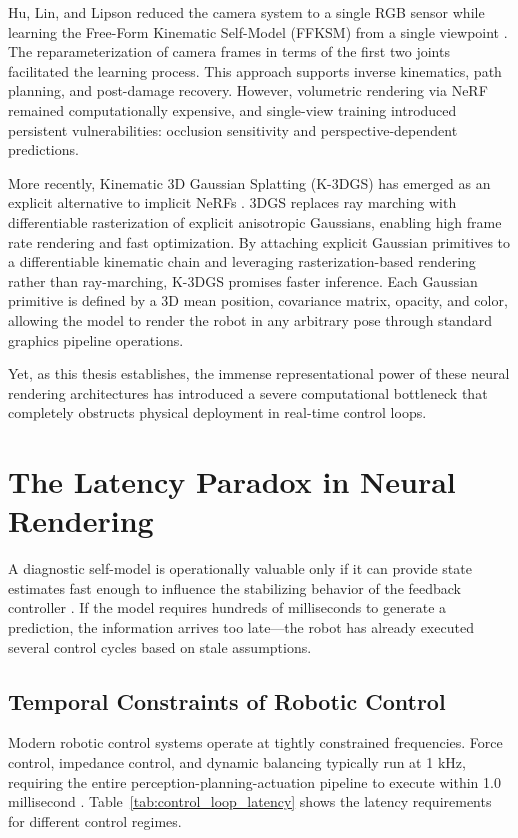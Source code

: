 \documentclass[12pt,a4paper,oneside]{report}
\begin{document}
Hu, Lin, and Lipson reduced the camera system to a single RGB sensor while learning the Free-Form Kinematic Self-Model (FFKSM) from a single viewpoint \cite{hu2024teaching}. The reparameterization of camera frames in terms of the first two joints facilitated the learning process. This approach supports inverse kinematics, path planning, and post-damage recovery. However, volumetric rendering via NeRF remained computationally expensive, and single-view training introduced persistent vulnerabilities: occlusion sensitivity and perspective-dependent predictions.

More recently, Kinematic 3D Gaussian Splatting (K-3DGS) has emerged as an explicit alternative to implicit NeRFs \cite{hu2025learning}. 3DGS replaces ray marching with differentiable rasterization of explicit anisotropic Gaussians, enabling high frame rate rendering and fast optimization. By attaching explicit Gaussian primitives to a differentiable kinematic chain and leveraging rasterization-based rendering rather than ray-marching, K-3DGS promises faster inference. Each Gaussian primitive is defined by a 3D mean position, covariance matrix, opacity, and color, allowing the model to render the robot in any arbitrary pose through standard graphics pipeline operations.

Yet, as this thesis establishes, the immense representational power of these neural rendering architectures has introduced a severe computational bottleneck that completely obstructs physical deployment in real-time control loops.

\section{The Latency Paradox in Neural Rendering}

A diagnostic self-model is operationally valuable only if it can provide state estimates fast enough to influence the stabilizing behavior of the feedback controller \cite{hu2024teaching, hu2025learning}. If the model requires hundreds of milliseconds to generate a prediction, the information arrives too late—the robot has already executed several control cycles based on stale assumptions.

\subsection{Temporal Constraints of Robotic Control}

Modern robotic control systems operate at tightly constrained frequencies. Force control, impedance control, and dynamic balancing typically run at 1 kHz, requiring the entire perception-planning-actuation pipeline to execute within 1.0 millisecond \cite{siciliano2009robotics}. Table~\ref{tab:control_loop_latency} shows the latency requirements for different control regimes.
\end{document}

